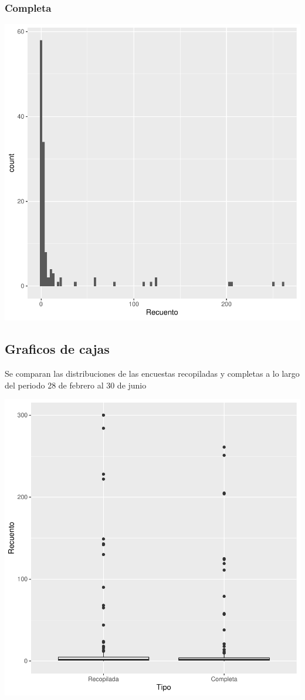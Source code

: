 \documentclass{article}
\begin{document}
\subsubsection{Completa}

\includegraphics{seguimento2-010}

\subsection{Graficos de cajas}
Se comparan las distribuciones de las encuestas recopiladas y completas a lo largo del periodo 28 de febrero al 30 de junio

\includegraphics{seguimento2-011}
\end{document}

